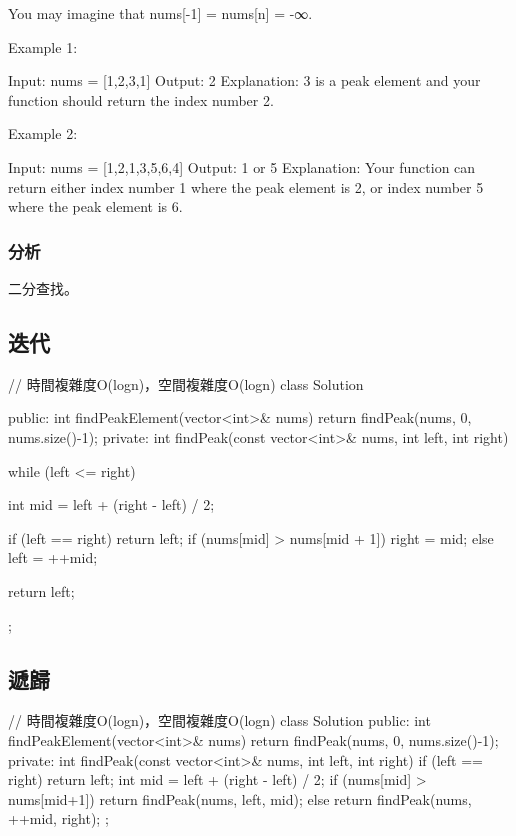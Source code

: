 You may imagine that nums[-1] = nums[n] = -∞.

Example 1:
\begin{Code}
Input: nums = [1,2,3,1]
Output: 2
Explanation: 3 is a peak element and your function should return the index number 2.
\end{Code}

Example 2:
\begin{Code}
Input: nums = [1,2,1,3,5,6,4]
Output: 1 or 5 
Explanation: Your function can return either index number 1 where the peak element is 2, 
             or index number 5 where the peak element is 6.
\end{Code}

\subsubsection{分析}
二分查找。


\subsection{迭代}
\begin{Code}
// 時間複雜度O(logn)，空間複雜度O(logn)
class Solution {
public:
    int findPeakElement(vector<int>& nums) {
        return findPeak(nums, 0, nums.size()-1);
    }
private:
    int findPeak(const vector<int>& nums, int left, int right)
    {
        while (left <= right)
        {
            int mid = left + (right - left) / 2;

            if (left == right)
                return left;
            if (nums[mid] > nums[mid + 1])
                right = mid;
            else
                left = ++mid;
        }
        return left;
    }
};
\end{Code}

\subsection{遞歸}
\begin{Code}
// 時間複雜度O(logn)，空間複雜度O(logn)
class Solution {
public:
    int findPeakElement(vector<int>& nums) {
        return findPeak(nums, 0, nums.size()-1);
    }
private:
    int findPeak(const vector<int>& nums, int left, int right)
    {
        if (left == right)
            return left;
        int mid = left + (right - left) / 2;
        if (nums[mid] > nums[mid+1])
            return findPeak(nums, left, mid);
        else
            return findPeak(nums, ++mid, right);
    }
};
\end{Code}

